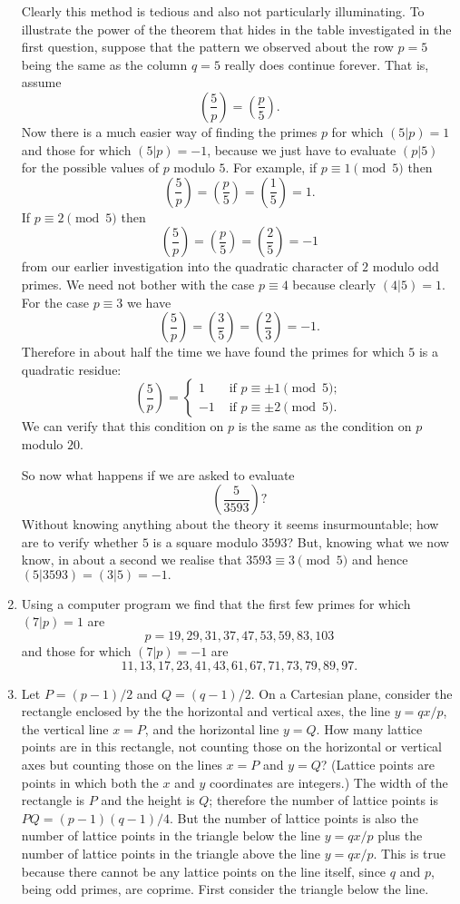 \documentclass[a4paper]{article}
\newcommand{\leg}[2]{\left(\frac{#1}{#2}\right)}
\newcommand{\ileg}[2]{(#1|#2)}
\begin{document}
\begin{enumerate}
		Clearly this method is tedious and also not particularly
		illuminating. To illustrate the power of the theorem
		that hides in the table investigated in the first question,
		suppose that the pattern we observed about the row
		\(p=5\) being the same as the column \(q=5\) really
		does continue forever. That is, assume
		\[\leg{5}{p}=\leg{p}{5}.\]
		Now there is a much easier way of finding the primes
		\(p\) for which \(\ileg{5}{p}=1\) and those for
		which \(\ileg{5}{p}=-1\), because we just have
		to evaluate \(\ileg{p}{5}\) for the possible
		values of \(p\) modulo \(5\). For example,
		if \(p\equiv1\pmod{5}\) then 
		\[\leg{5}{p}=\leg{p}{5}=\leg{1}{5}=1.\]
		If \(p\equiv2\pmod{5}\) then
		\[\leg{5}{p}=\leg{p}{5}=\leg{2}{5}=-1\]
		from our earlier investigation into the quadratic
		character of \(2\) modulo odd primes.
		We need not bother with the case \(p\equiv4\)
		because clearly \(\ileg{4}{5}=1\). For
		the case \(p\equiv3\) we have
		\[\leg{5}{p}=\leg{3}{5}=\leg{2}{3}=-1.\]
		Therefore in about half the time we have found
		the primes for which \(5\) is a quadratic residue:
		\[\leg{5}{p}=\begin{cases}
			1&\text{ if }p\equiv\pm1\pmod{5};\\
			-1&\text{ if }p\equiv\pm2\pmod{5}.
		\end{cases}
		\]
		We can verify that this condition on \(p\)
		is the same as the condition on \(p\) modulo \(20\).

		So now what happens if we are asked to evaluate
		\[\leg{5}{3593}?\]
		Without knowing anything about the theory it seems
		insurmountable; how are to verify whether \(5\) is a square
		modulo \(3593\)?
		But, knowing what we now know, in about a second we realise that \(3593\equiv3\pmod{5}\)
		and hence \(\ileg{5}{3593}=\ileg{3}{5}=-1.\)
	\item Using a computer program we find that the first few primes
		for which \(\ileg{7}{p}=1\) are
		\[p=19,29,31,37,47,53,59,83,103\]
		and those for which \(\ileg{7}{p}=-1\) are
		\[11,13,17,23,41,43,61,67,71,73,79,89,97.\]
	\item Let \(P=(p-1)/2\) and
		\(Q=(q-1)/2\).
		On a Cartesian plane, consider the rectangle enclosed by 
		the the horizontal and vertical axes, the line \(y=qx/p\),
		the vertical line \(x=P\), and the horizontal line \(y=Q\).
		How many lattice points are in this rectangle, not counting
		those on the horizontal or vertical axes but counting
		those on the lines \(x=P\) and \(y=Q\)? (Lattice
		points are points in which both the \(x\) and \(y\)
		coordinates are integers.)
		The width of the rectangle is \(P\) and the height
		is \(Q\); therefore the number of lattice points
		is \(PQ=(p-1)(q-1)/4.\) But the number of lattice
		points is also the number of lattice points in the triangle
		below the line \(y=qx/p\) plus the number of lattice
		points in the triangle above the line \(y=qx/p\). This
		is true because there cannot be any lattice points
		on the line itself, since \(q\) and \(p\), being odd primes,
		are coprime.
		First consider the triangle below the line.


\end{enumerate}
\end{document}
